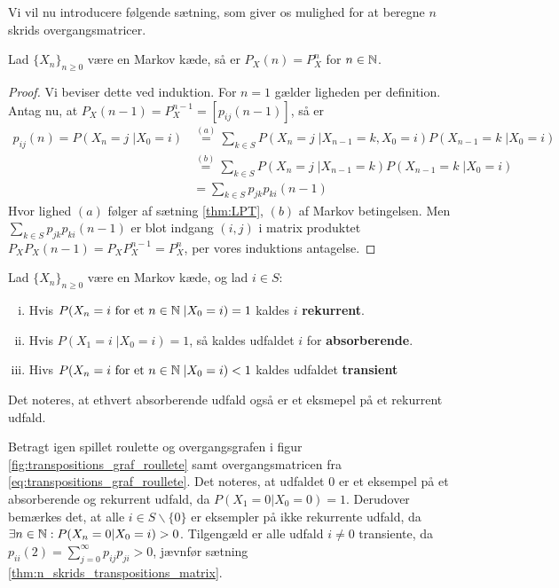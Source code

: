 Vi vil nu introducere følgende sætning, som giver os mulighed for at beregne $n$ skrids overgangsmatricer.
\begin{thm} \label{thm:n_skrids_transpositions_matrix}
Lad $\{X_n\}_{n \geq 0}$ være en Markov kæde, så er $P_X(n) = P_X^n$ for $n \in \mathbb{N}$.
\end{thm}
\begin{proof}
Vi beviser dette ved induktion. For $n = 1$ gælder ligheden per definition. Antag nu, at $P_X(n - 1) = P_X^{n - 1} = [p_{ij}(n - 1)]$, så er 
\begin{align*} 
    p_{ij}(n) = P(X_n = j \;| X_0 = i) &\stackrel{(a)}= \sum_{k \in S} P(X_n = j\; | X_{n - 1} = k, X_0 = i) P(X_{n - 1} = k\; | X_0 = i) \\
    &\stackrel{(b)}= \sum_{k \in S} P(X_n = j\; | X_{n - 1} = k) P(X_{n - 1} = k\; | X_0 = i) \\
    &= \sum_{k \in S} p_{jk}p_{ki}(n - 1) 
\end{align*}
Hvor lighed $(a)$ følger af sætning \ref{thm:LPT}, $(b)$ af Markov betingelsen. Men $\displaystyle \sum_{k \in S} p_{jk}p_{ki}(n - 1)$ er blot indgang $(i, j)$ i matrix produktet $P_X P_X(n - 1) = P_X P_X^{n - 1} = P_X^n$, per vores induktions antagelse.
\end{proof}

\begin{defn}
  Lad $\{X_{n}\}_{n \geq 0}$ være en Markov kæde, og lad $i \in S$:
  \begin{enumerate}[i)]
    \item Hvis $P(X_{n} = i \text{ for et } n \in \mathbb{N} \;| X_{0} = i) = 1$ kaldes $i$ \textbf{rekurrent}.
    \item Hvis $P(X_{1} = i \;| X_{0} = i) = 1$, så kaldes udfaldet $i$ for \textbf{absorberende}.
    \item Hivs $P(X_n = i \text{ for et } n \in \mathbb{N} \;| X_0 = i) < 1$ kaldes udfaldet \textbf{transient}
  \end{enumerate}
\end{defn}

\begin{remark}
  Det noteres, at ethvert absorberende udfald også er et eksmepel på et rekurrent udfald.
\end{remark}

\begin{example}
  Betragt igen spillet roulette og overgangsgrafen i figur \ref{fig:transpositions_graf_roullete} samt overgangsmatricen fra \ref{eq:transpositions_graf_roullete}. Det noteres, at udfaldet $0$ er et eksempel på et absorberende og rekurrent udfald, da $P(X_{1} = 0 | X_{0} = 0) = 1$. Derudover bemærkes det, at alle $i \in S \backslash \{0\}$ er eksempler på ikke rekurrente udfald, da $\exists n \in \mathbb{N}: P(X_{n} = 0 | X_{0} = i) > 0$. Tilgengæld er alle udfald $i \neq 0$ transiente, da $p_{ii}(2) = \sum_{j=0}^{\infty} p_{ij}p_{ji} > 0$, jævnfør sætning \ref{thm:n_skrids_transpositions_matrix}.
\end{example}

